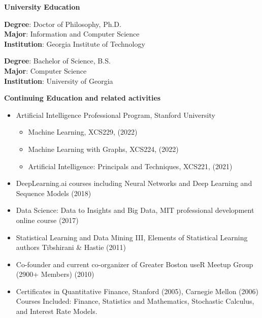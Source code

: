 \documentclass[
]{article}
\providecommand{\tightlist}{%
  \setlength{\itemsep}{0pt}\setlength{\parskip}{0pt}}
\begin{document}
\hypertarget{university-education}{%
{\large \textbf{University Education}}\label{university-education}}

\textbf{Degree}: Doctor of Philosophy,  Ph.D.\\
\textbf{Major}: Information and Computer Science \\
\textbf{Institution}: Georgia Institute of Technology\\
\vspace{0.1in}

\textbf{Degree}: Bachelor of Science, B.S. \\
\textbf{Major}: Computer Science \\
\textbf{Institution}: University of Georgia

\hypertarget{continuing-education-and-related-activities}{%
{\large \textbf{Continuing Education and related
activities}}
\label{continuing-education-and-related-activities}}

\begin{itemize}
\tightlist
\item
  Artificial Intelligence Professional Program, Stanford University

  \begin{itemize}
  \tightlist
  \item
    Machine Learning, XCS229, (2022)
  \item
    Machine Learning with Graphs, XCS224, (2022)
  \item
    Artificial Intelligence: Principals and Techniques, XCS221, (2021)
  \end{itemize}
\item
  DeepLearning.ai courses including Neural Networks and Deep Learning
  and Sequence Models (2018)
\item
  Data Science: Data to Insights and Big Data, MIT professional
  development online course (2017)
\item
  Statistical Learning and Data Mining III, Elements of Statistical
  Learning authors Tibshirani \& Hastie (2011)
\item
  Co-founder and current co-organizer of Greater Boston useR Meetup
  Group (2900+ Members) (2010)
\item
  Certificates in Quantitative Finance, Stanford (2005), Carnegie Mellon
  (2006)\\
  Courses Included: Finance, Statistics and Mathematics, Stochastic
  Calculus, and Interest Rate Models.
\end{itemize}
\end{document}
